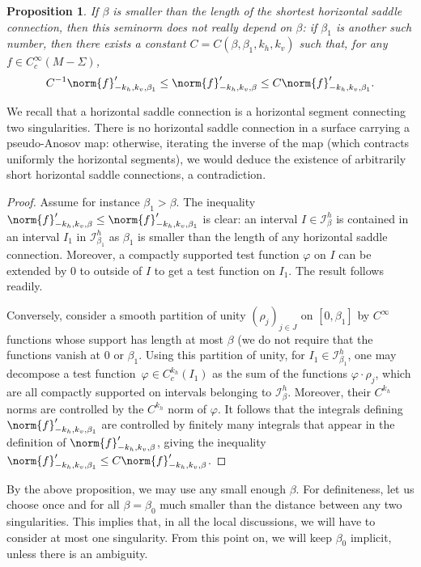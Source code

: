 \documentclass[JEP,XML,SOM,Unicode]{cedram}
\newcommand{\boI}{\mathcal{I}}
\let\phi\varphi
\newtheorem{prop}[thm]{Proposition}
\theoremstyle{definition}
\numberwithin{equation}{section}
\begin{document}
\begin{prop}
\label{prop:beta_irrelevant} If $\beta$ is smaller than the length of the
shortest horizontal saddle connection, then this seminorm does not really
depend on $\beta$: if $\beta_1$ is another such number, then there exists a
constant $C=C(\beta, \beta_1, k_h, k_v)$ such that, for any $f \in
C^\infty_c(M-\Sigma)$,
\begin{equation*}
C^{-1}\norm{f}'_{-k_h, k_v, \beta_1} \leq \norm{f}'_{-k_h, k_v, \beta} \leq C\norm{f}'_{-k_h, k_v, \beta_1}.
\end{equation*}
\end{prop}
We recall that a horizontal saddle connection is a horizontal segment
connecting two singularities. There is no horizontal saddle connection in a
surface carrying a pseudo-Anosov map: otherwise, iterating the inverse of the
map (which contracts uniformly the horizontal segments), we would deduce the
existence of arbitrarily short horizontal saddle connections, a
contradiction.
\begin{proof}
Assume for instance $\beta_1>\beta$. The inequality $\norm{f}'_{-k_h, k_v,
\beta} \leq \norm{f}'_{-k_h, k_v, \beta_1}$ is clear: an interval $I \in
\boI^h_\beta$ is contained in an interval $I_1$ in $\boI^h_{\beta_1}$ as
$\beta_1$ is smaller than the length of any horizontal saddle connection.
Moreover, a compactly supported test function $\phi$ on $I$ can be extended
by $0$ to outside of $I$ to get a test function on $I_1$. The result follows
readily.

Conversely, consider a smooth partition of unity $(\rho_j)_{j\in J}$ on
$[0,\beta_1]$ by $C^\infty$ functions whose support has length at most
$\beta$ (we do not require that the functions vanish at $0$ or $\beta_1$.
Using this partition of unity, for $I_1 \in \boI^h_{\beta_1}$, one may
decompose a test function~\hbox{$\phi\in C^{k_h}_c(I_1)$} as the sum of the
functions $\phi\cdot \rho_j$, which are all compactly supported on intervals
belonging to $\boI^h_{\beta}$. Moreover, their $C^{k_h}$ norms are controlled
by the $C^{k_h}$ norm of $\phi$. It follows that the integrals defining
$\norm{f}'_{-k_h, k_v, \beta_1}$ are controlled by finitely many integrals
that appear in the definition of $\norm{f}'_{-k_h, k_v, \beta}$, giving the
inequality $\norm{f}'_{-k_h, k_v, \beta_1} \leq C \norm{f}'_{-k_h, k_v,
\beta}$.
\end{proof}

By the above proposition, we may use any small enough $\beta$. For
definiteness, let us choose once and for all $\beta=\beta_0$ much smaller
than the distance between any two singularities. This implies that, in all
the local discussions, we will have to consider at most one singularity. From
this point on, we will keep $\beta_0$ implicit, unless there is an ambiguity.
\end{document}
